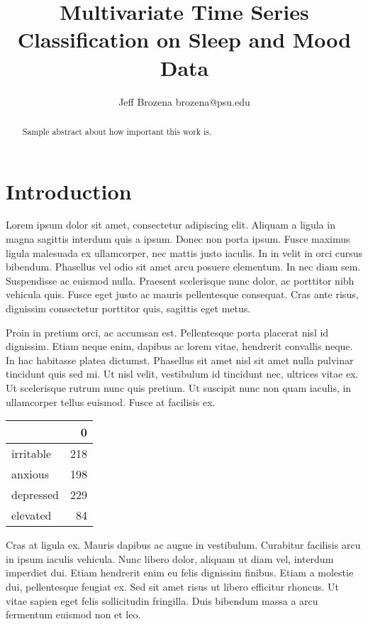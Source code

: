 \documentclass{article}
\begin{document}
\title{Multivariate Time Series Classification on Sleep and Mood Data}

\author{\name Jeff Brozena \email brozena@psu.edu}
\maketitle

\begin{abstract}%
  Sample abstract about how important this work is.
\end{abstract}

\section{Introduction}

\citep{ruwaardEcological}
\citet{ruwaardEcological}

Lorem ipsum dolor sit amet, consectetur adipiscing elit. Aliquam a ligula in magna sagittis interdum quis a ipsum. Donec non porta ipsum. Fusce maximus ligula malesuada ex ullamcorper, nec mattis justo iaculis. In in velit in orci cursus bibendum. Phasellus vel odio sit amet arcu posuere elementum. In nec diam sem. Suspendisse ac euismod nulla. Praesent scelerisque nunc dolor, ac porttitor nibh vehicula quis. Fusce eget justo ac mauris pellentesque consequat. Cras ante risus, dignissim consectetur porttitor quis, sagittis eget metus.

Proin in pretium orci, ac accumsan est. Pellentesque porta placerat nisl id dignissim. Etiam neque enim, dapibus ac lorem vitae, hendrerit convallis neque. In hac habitasse platea dictumst. Phasellus sit amet nisl sit amet nulla pulvinar tincidunt quis sed mi. Ut nisl velit, vestibulum id tincidunt nec, ultrices vitae ex. Ut scelerisque rutrum nunc quis pretium. Ut suscipit nunc non quam iaculis, in ullamcorper tellus euismod. Fusce at facilisis ex.

\begin{tabular}{lr}
\toprule
{} &    0 \\
\midrule
irritable &  218 \\
anxious   &  198 \\
depressed &  229 \\
elevated  &   84 \\
\bottomrule
\end{tabular}

Cras at ligula ex. Mauris dapibus ac augue in vestibulum. Curabitur facilisis arcu in ipsum iaculis vehicula. Nunc libero dolor, aliquam ut diam vel, interdum imperdiet dui. Etiam hendrerit enim eu felis dignissim finibus. Etiam a molestie dui, pellentesque feugiat ex. Sed sit amet risus ut libero efficitur rhoncus. Ut vitae sapien eget felis sollicitudin fringilla. Duis bibendum massa a arcu fermentum euismod non et leo.
\end{document}
